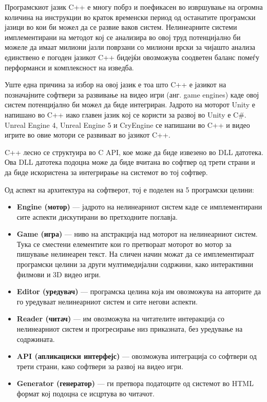 Програмскиот јазик C++ е многу побрз и поефикасен во извршување на огромна количина на инструкции во краток временски период од останатите програмски јазици во кои би можел да се развие ваков систем. Нелинеарните системи имплементирани на методот кој се анализира во овој труд потенцијално би можеле да имаат милиони јазли поврзани со милиони врски за чијашто анализа единствено е погоден јазикот C++ бидејќи овозможува соодветен баланс помеѓу перформанси и комплексност на изведба.

Уште една причина за избор на овој јазик е тоа што C++ е јазикот на позначајните софтвери за развивање на видео игри (анг. game engines) каде овој систем потенцијално би можел да биде интегриран. Јадрото на моторот Unity е напишано во C++ иако главен јазик кој се користи за развој во Unity е C\#. Unreal Engine 4, Unreal Engine 5 и CryEngine се напишани во C++ и видео игрите во овие мотори се развиваат во јазикот C++.

C++ лесно се структуира во C API, кое може да биде извезено во DLL датотека. Ова DLL датотека подоцна може да биде вчитана во софтвер од трети страни и да биде искористена за интегрирање на системот во тој софтвер.

Од аспект на архитектура на софтверот, тој е поделен на 5 програмски целини:

\begin{itemize}
\item \textbf{Engine (мотор)} — јадрото на нелинеарниот систем каде се имплементирани сите аспекти дискутирани во претходните поглавја.
\item \textbf{Game (игра)} — ниво на апстракција над моторот на нелинеарниот систем. Тука се сместени елементите кои го претвораат моторот во мотор за пишување нелинеарен текст. На сличен начин можат да се имплементираат програмски целини за други мултимедијални содржини, како интерактивни филмови и 3D видео игри.
\item \textbf{Editor (уредувач)} — програмска целина која им овозможува на авторите да го уредуваат нелинеарниот систем и сите негови аспекти.
\item \textbf{Reader (читач)} — им овозможува на читателите интеракција со нелинеарниот систем и прогресирање низ приказната, без уредување на содржината.
\item \textbf{API (апликациски интерфејс)} — овозможува интеграција со софтвери од трети страни, како софтвери за развој на видео игри.
\item \textbf{Generator (генератор)} — ги претвора податоците од системот во HTML формат кој подоцна се исцртува во читачот.
\end{itemize}

